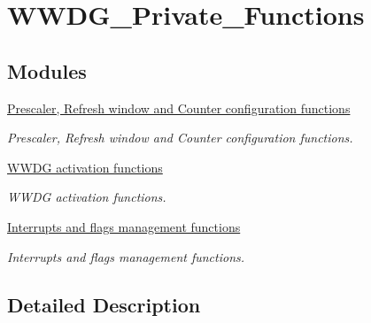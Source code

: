 \hypertarget{group___w_w_d_g___private___functions}{}\section{W\+W\+D\+G\+\_\+\+Private\+\_\+\+Functions}
\label{group___w_w_d_g___private___functions}
\subsection*{Modules}
\begin{DoxyCompactItemize}
\item 
\hyperlink{group___w_w_d_g___group1}{Prescaler, Refresh window and Counter configuration functions}
\begin{DoxyCompactList}\small\item\em Prescaler, Refresh window and Counter configuration functions. \end{DoxyCompactList}\item 
\hyperlink{group___w_w_d_g___group2}{W\+W\+D\+G activation functions}
\begin{DoxyCompactList}\small\item\em W\+W\+D\+G activation functions. \end{DoxyCompactList}\item 
\hyperlink{group___w_w_d_g___group3}{Interrupts and flags management functions}
\begin{DoxyCompactList}\small\item\em Interrupts and flags management functions. \end{DoxyCompactList}\end{DoxyCompactItemize}


\subsection{Detailed Description}
